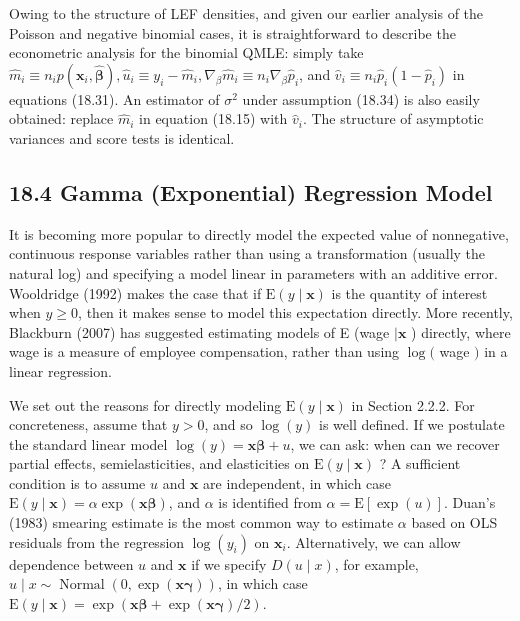 \documentclass[10pt]{article}
\begin{document}
Owing to the structure of LEF densities, and given our earlier analysis of the Poisson and negative binomial cases, it is straightforward to describe the econometric analysis for the binomial QMLE: simply take $\hat{m}_{i} \equiv n_{i} p\left(\mathbf{x}_{i}, \hat{\boldsymbol{\beta}}\right), \hat{u}_{i} \equiv y_{i}-\hat{m}_{i}, \nabla_{\beta} \hat{m}_{i} \equiv n_{i} \nabla_{\beta} \hat{p}_{i}$, and $\hat{v}_{i} \equiv n_{i} \hat{p}_{i}\left(1-\hat{p}_{i}\right)$ in equations (18.31). An estimator of $\sigma^{2}$ under assumption (18.34) is also easily obtained: replace $\hat{m}_{i}$ in equation (18.15) with $\hat{v}_{i}$. The structure of asymptotic variances and score tests is identical.

\subsection*{18.4 Gamma (Exponential) Regression Model}
It is becoming more popular to directly model the expected value of nonnegative, continuous response variables rather than using a transformation (usually the natural log) and specifying a model linear in parameters with an additive error. Wooldridge (1992) makes the case that if $\mathrm{E}(y \mid \mathbf{x})$ is the quantity of interest when $y \geq 0$, then it makes sense to model this expectation directly. More recently, Blackburn (2007) has suggested estimating models of E (wage $\mid \mathbf{x}$ ) directly, where wage is a measure of employee compensation, rather than using $\log ($ wage $)$ in a linear regression.

We set out the reasons for directly modeling $\mathrm{E}(y \mid \mathbf{x})$ in Section 2.2.2. For concreteness, assume that $y>0$, and so $\log (y)$ is well defined. If we postulate the standard linear model $\log (y)=\mathbf{x} \boldsymbol{\beta}+u$, we can ask: when can we recover partial effects, semielasticities, and elasticities on $\mathrm{E}(y \mid \mathbf{x})$ ? A sufficient condition is to assume $u$ and $\mathbf{x}$ are independent, in which case $\mathrm{E}(y \mid \mathbf{x})=\alpha \exp (\mathbf{x} \boldsymbol{\beta})$, and $\alpha$ is identified from $\alpha=\mathrm{E}[\exp (u)]$. Duan's (1983) smearing estimate is the most common way to estimate $\alpha$ based on OLS residuals from the regression $\log \left(y_{i}\right)$ on $\mathbf{x}_{i}$. Alternatively, we can allow dependence between $u$ and $\mathbf{x}$ if we specify $D(u \mid x)$, for example, $u \mid x \sim \operatorname{Normal}(0, \exp (\mathbf{x} \boldsymbol{\gamma}))$, in which case $\mathrm{E}(y \mid \mathbf{x})=\exp (\mathbf{x} \boldsymbol{\beta}+\exp (\mathbf{x} \boldsymbol{\gamma}) / 2)$.
\end{document}
